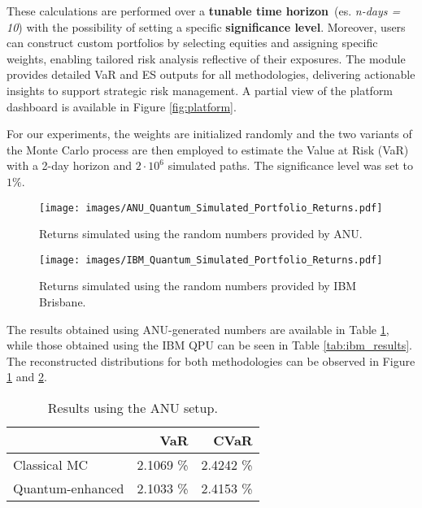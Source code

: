 \documentclass{article}
\begin{document}
These calculations are performed over a \textbf{tunable time horizon} (es. \textit{n-days = 10}) with the possibility of setting a specific \textbf{ significance level}.
Moreover, users can construct custom portfolios by selecting equities and assigning specific weights, enabling tailored risk analysis reflective of their exposures. The module provides detailed VaR and ES outputs for all methodologies, delivering actionable insights to support strategic risk management.  
A partial view of the platform dashboard is available in Figure \ref{fig:platform}.

For our experiments, the weights are initialized randomly and the two variants of the Monte Carlo process are then employed to estimate the Value at Risk (VaR) with a 2-day horizon and $2\cdot10^6$ simulated paths. 
The significance level was set to $1\%$.

\begin{figure}
    \centering
    \texttt{[image: images/ANU\_Quantum\_Simulated\_Portfolio\_Returns.pdf]}
    \caption{Returns simulated using the random numbers provided by ANU.}
    \label{fig:anu_quantum_returns}
\end{figure}

\begin{figure}
    \centering
    \texttt{[image: images/IBM\_Quantum\_Simulated\_Portfolio\_Returns.pdf]}
    \caption{Returns simulated using the random numbers provided by IBM Brisbane.}
    \label{fig:ibm_quantum_returns}
\end{figure}


The results obtained using ANU-generated numbers are available in Table \ref{tab:anu_results}, while those obtained using the IBM QPU can be seen in Table \ref{tab:ibm_results}. The reconstructed distributions for both methodologies can be observed in Figure \ref{fig:anu_quantum_returns} and \ref{fig:ibm_quantum_returns}.

\begin{table}[h]
  \centering
  \begin{tabular}{lrr}
    \toprule
     & VaR & CVaR \\ \midrule
    Classical MC & 2.1069 \% & 2.4242 \% \\ 
    Quantum-enhanced & 2.1033 \% & 2.4153 \% \\ \bottomrule
  \end{tabular}
  \caption{Results using the ANU setup.}
  \label{tab:anu_results}
\end{table}
\end{document}
